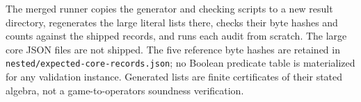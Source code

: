 The merged runner copies the generator and checking scripts to a new result
directory, regenerates the large literal lists there, checks their byte
hashes and counts against the shipped records, and runs each audit from scratch. The large core JSON files are not shipped.
The five reference byte hashes are retained in
\texttt{nested/expected-core-records.json}; no Boolean predicate table is
materialized for any validation instance. Generated lists are finite
certificates of their stated algebra, not a game-to-operators soundness
verification.

